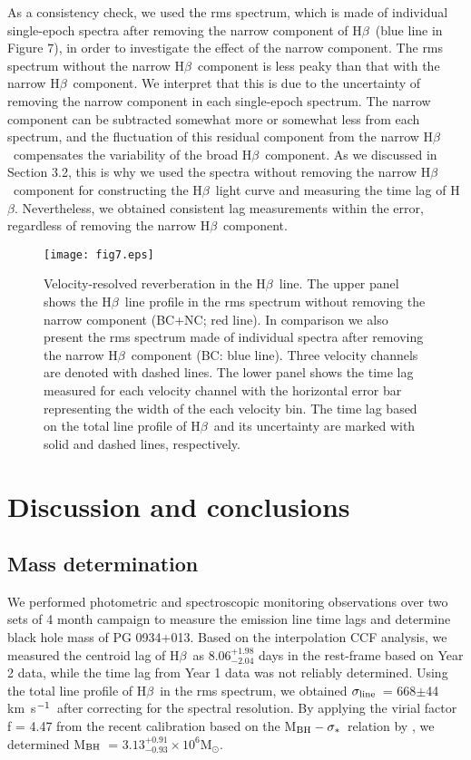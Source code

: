 \documentclass[iop]{emulateapj}
\newcommand{\Hb}{\rm H{$\beta$}}
\newcommand{\mbh}{M$_{\rm BH}$}
\newcommand{\msun}{M$_{\odot}$}
\newcommand{\msigma}{M$_{\rm BH}-\sigma_{*}$}
\newcommand{\kms}{km~s$^{\rm -1}$}
\newcommand{\sigmaline}{$\sigma_{\rm line}$}
\begin{document}
As a consistency check, we used the rms spectrum, which is made of individual single-epoch spectra after removing the narrow component of 
\Hb\ (blue line in Figure 7), in order to investigate the effect of the narrow component. The rms spectrum without the narrow \Hb\ component is less peaky than that with the narrow \Hb\ component. We interpret that this is due to the uncertainty of removing the narrow component in each single-epoch spectrum.
 The narrow component can be subtracted somewhat more or somewhat less from each spectrum, and the fluctuation of this residual
 component from the narrow \Hb\ compensates the variability of the broad \Hb\ component. 
 As we discussed in Section 3.2, this is why we used the spectra without removing the narrow \Hb\ component for constructing the \Hb\ light curve and measuring the time lag of \Hb. Nevertheless, we obtained consistent lag measurements within the error, regardless of removing the narrow \Hb\ component. 

\begin{figure}
	\texttt{[image: fig7.eps]}
	\caption{Velocity-resolved reverberation in the \Hb\ line. The upper panel shows the \Hb\ line profile in the rms spectrum without removing the narrow component (BC+NC; red line). In comparison we also present the rms spectrum made of individual spectra after removing the narrow \Hb\ component (BC: blue line). Three velocity channels are denoted with dashed lines. The lower panel shows  the time lag measured for each velocity channel with the horizontal error bar representing the width of the each velocity bin. The time lag based on the total line profile of \Hb\ and its uncertainty are marked with solid and dashed lines,
	respectively.  
		\label{fig6}}
\end{figure} 




\section{Discussion and conclusions}

\subsection{Mass determination}

We performed photometric and spectroscopic monitoring observations over two sets of 4 month campaign to measure the emission line time lags and determine black hole mass of PG 0934+013. 
Based on the interpolation CCF analysis, we measured the centroid lag of \Hb\ as $8.06^{+1.98}_{-2.04}$ days in the rest-frame based on Year 2 data, while the time lag from Year 1 data was not reliably determined. Using the total line profile of \Hb\ in the rms spectrum,
we obtained \sigmaline\ = 668$\pm$44 \kms\ after correcting for the spectral resolution.
By applying the virial factor f = 4.47 from the recent calibration based on
the \msigma\ relation by \citet{Woo2015}, we determined \mbh\ = $3.13^{+0.91}_{-0.93} \times 10^{6}$\msun.
\end{document}
